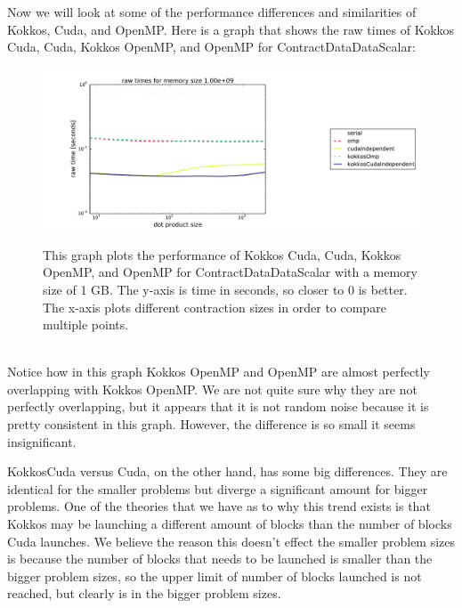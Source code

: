 Now we will look at some of the performance differences and similarities of
Kokkos, Cuda, and OpenMP. Here is a graph that shows the raw times of Kokkos
Cuda, Cuda, Kokkos OpenMP, and OpenMP for ContractDataDataScalar: \\
\begin{figure}[!ht]
{\includegraphics[scale=.4]{CDDS_RawTimes_2d_largestSize_Comparison.pdf}}
\caption[ContractDataDataScalar Kokkos performance comparison]{This graph plots the performance of Kokkos Cuda, Cuda, Kokkos OpenMP,
and OpenMP for ContractDataDataScalar with a memory size of 1 GB. 
The y-axis is time in
seconds, so closer to 0 is better. The x-axis plots different contraction sizes
in order to compare multiple points.}
\label{fig:ContractDataDataScalar Kokkos performance comparison}
\end{figure} \\
Notice how in this graph Kokkos OpenMP and OpenMP are almost perfectly
overlapping with Kokkos OpenMP. We are not quite sure why they are not perfectly
overlapping, but it appears that it is not random noise because it is pretty
consistent in this graph. However, the difference is so small it seems
insignificant. 

KokkosCuda versus Cuda, on the other hand, has some big differences. They are
identical for the smaller problems but diverge a significant amount for bigger
problems. One of the theories that we have as to why this trend exists is that
Kokkos may be launching a different amount of blocks than the number of blocks Cuda launches.
We believe the reason this doesn't effect the smaller problem sizes is because
the number of blocks that needs to be launched is smaller than the bigger problem sizes, so
the upper limit of number of blocks launched is not reached, but clearly is in the bigger problem sizes. 

